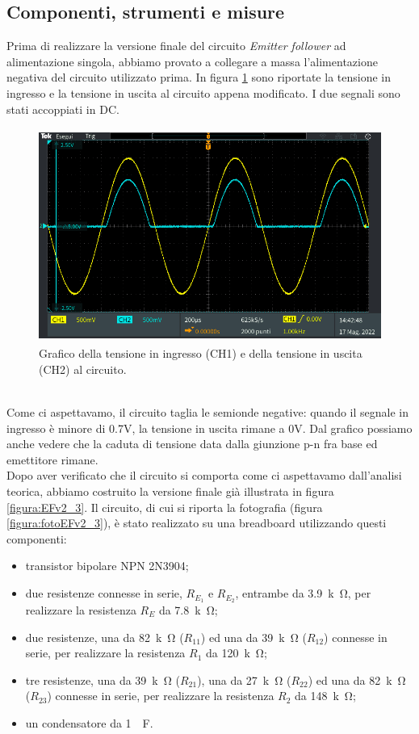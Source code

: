 \documentclass{report}
\begin{document}
\subsection{Componenti, strumenti e misure} 
Prima di realizzare la versione finale del circuito \textit{Emitter follower} ad alimentazione singola, abbiamo provato a collegare a massa l'alimentazione negativa del circuito utilizzato prima. In figura \ref{figura:oscillo2} sono riportate la tensione in ingresso e la tensione in uscita al circuito appena modificato. I due segnali sono stati accoppiati in DC.
\begin{figure}[h]
\centering
\includegraphics[height=7cm]{immagini/oscillo2}
\caption{Grafico della tensione in ingresso (CH1) e della tensione in uscita (CH2) al circuito.}
\label{figura:oscillo2}
\end{figure}
\\\indent Come ci aspettavamo, il circuito taglia le semionde negative: quando il segnale in ingresso è minore di 0.7V, la tensione in uscita rimane a 0V. Dal grafico possiamo anche vedere che la caduta di tensione data dalla giunzione p-n fra base ed emettitore rimane.
\\\indent Dopo aver verificato che il circuito si comporta come ci aspettavamo dall'analisi teorica, abbiamo costruito la versione finale già illustrata in figura \ref{figura:EFv2_3}. Il circuito, di cui si riporta la fotografia (figura \ref{figura:fotoEFv2_3}), è stato realizzato su una breadboard utilizzando questi componenti:
\begin{itemize}
\item transistor bipolare NPN 2N3904;
\item due resistenze connesse in serie, $R_{E_1}$ e $R_{E_2}$, entrambe da \SI{3.9}{k\ohm}, per realizzare la resistenza $R_E$ da \SI{7.8}{k\ohm};
\item due resistenze, una da \SI{82}{k\ohm} ($R_{11}$) ed una da \SI{39}{k\ohm} ($R_{12}$) connesse in serie, per realizzare la resistenza $R_1$ da \SI{120}{k\ohm};
\item tre resistenze, una da \SI{39}{k\ohm} ($R_{21}$), una da \SI{27}{k\ohm} ($R_{22}$) ed una da \SI{82}{k\ohm} ($R_{23}$) connesse in serie, per realizzare la resistenza $R_2$ da \SI{148}{k\ohm};
\item un condensatore da \SI{1}{\mu\farad}.
\end{itemize}
\end{document}

